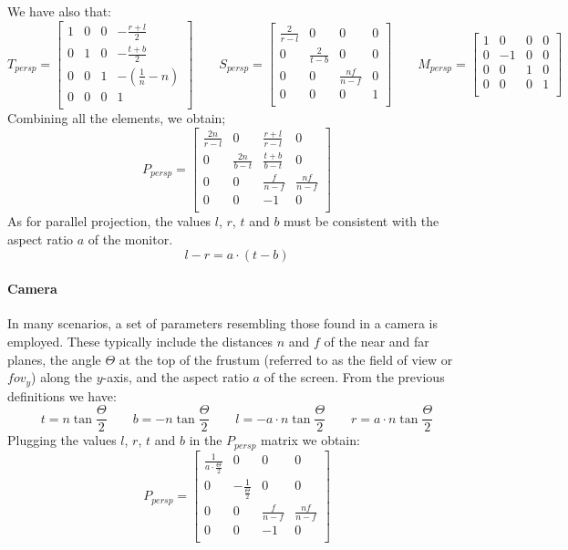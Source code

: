 We have also that: 
\[T_{persp}= \begin{bmatrix}
    1 & 0 & 0 & -\frac{r+l}{2} \\
    0 & 1 & 0 & -\frac{t+b}{2} \\
    0 & 0 & 1 & -\left(\frac{1}{n}-n\right) \\
    0 & 0 & 0 & 1 \\
\end{bmatrix} \qquad
S_{persp}= \begin{bmatrix}
    \frac{2}{r-l} & 0 & 0 & 0 \\
    0 & \frac{2}{t-b} & 0 & 0 \\
    0 & 0 & \frac{nf}{n-f} & 0 \\
    0 & 0 & 0 & 1 \\
\end{bmatrix} \qquad
M_{persp}= \begin{bmatrix}
    1 & 0 & 0 & 0 \\
    0 & -1 & 0 & 0 \\
    0 & 0 & 1 & 0 \\
    0 & 0 & 0 & 1 \\
\end{bmatrix}\]
Combining all the elements, we obtain; 
\[P_{persp}=\begin{bmatrix}
    \frac{2n}{r-l} & 0 & \frac{r+l}{r-l} & 0 \\
    0 & \frac{2n}{b-t} & \frac{t+b}{b-t} & 0 \\
    0 & 0 & \frac{f}{n-f} & \frac{nf}{n-f} \\
    0 & 0 & -1 & 0 \\
\end{bmatrix}\]
As for parallel projection, the values $l$, $r$, $t$ and $b$ must be consistent with the aspect ratio $a$ of the monitor.
\[l-r=a\cdot(t-b)\]

\paragraph*{Camera}
In many scenarios, a set of parameters resembling those found in a camera is employed. 
These typically include the distances $n$ and $f$ of the near and far planes, the angle $\Theta$ at the top of the frustum (referred to as the field of view or $fov_y$) along the $y$-axis, and the aspect ratio $a$ of the screen.
From the previous definitions we have:
\[t=n\tan\dfrac{\Theta}{2} \qquad b=-n\tan\dfrac{\Theta}{2} \qquad l=-a \cdot n\tan\dfrac{\Theta}{2} \qquad r=a \cdot n\tan\dfrac{\Theta}{2}\]
Plugging the values $l$, $r$, $t$ and $b$ in the $P_{persp}$ matrix we obtain:
\[P_{persp}=\begin{bmatrix}
    \frac{1}{a\cdot \frac{\Theta}{2}} & 0 & 0 & 0 \\
    0 & -\frac{1}{\frac{\Theta}{2}} & 0 & 0 \\
    0 & 0 & \frac{f}{n-f} & \frac{nf}{n-f} \\
    0 & 0 & -1 & 0 \\
\end{bmatrix}\]

